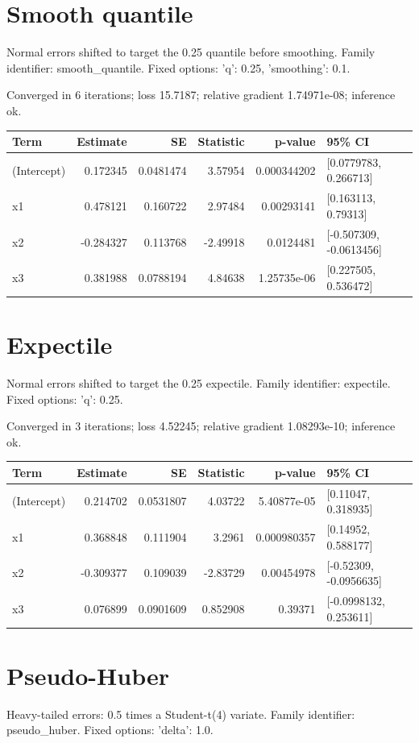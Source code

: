 \documentclass[11pt]{article}
\begin{document}
\section{Smooth quantile}
Normal errors shifted to target the 0.25 quantile before smoothing. Family identifier: smooth\_quantile. Fixed options: {'q': 0.25, 'smoothing': 0.1}.

Converged in 6 iterations; loss 15.7187; relative gradient 1.74971e-08; inference ok.
\begin{center}\small\begin{tabular}{lrrrrl}\toprule
Term & Estimate & SE & Statistic & p-value & 95\% CI \\ \midrule
(Intercept) & 0.172345 & 0.0481474 & 3.57954 & 0.000344202 & [0.0779783, 0.266713] \\
x1 & 0.478121 & 0.160722 & 2.97484 & 0.00293141 & [0.163113, 0.79313] \\
x2 & -0.284327 & 0.113768 & -2.49918 & 0.0124481 & [-0.507309, -0.0613456] \\
x3 & 0.381988 & 0.0788194 & 4.84638 & 1.25735e-06 & [0.227505, 0.536472] \\
\bottomrule\end{tabular}\end{center}
\section{Expectile}
Normal errors shifted to target the 0.25 expectile. Family identifier: expectile. Fixed options: {'q': 0.25}.

Converged in 3 iterations; loss 4.52245; relative gradient 1.08293e-10; inference ok.
\begin{center}\small\begin{tabular}{lrrrrl}\toprule
Term & Estimate & SE & Statistic & p-value & 95\% CI \\ \midrule
(Intercept) & 0.214702 & 0.0531807 & 4.03722 & 5.40877e-05 & [0.11047, 0.318935] \\
x1 & 0.368848 & 0.111904 & 3.2961 & 0.000980357 & [0.14952, 0.588177] \\
x2 & -0.309377 & 0.109039 & -2.83729 & 0.00454978 & [-0.52309, -0.0956635] \\
x3 & 0.076899 & 0.0901609 & 0.852908 & 0.39371 & [-0.0998132, 0.253611] \\
\bottomrule\end{tabular}\end{center}
\section{Pseudo-Huber}
Heavy-tailed errors: 0.5 times a Student-t(4) variate. Family identifier: pseudo\_huber. Fixed options: {'delta': 1.0}.
\end{document}
